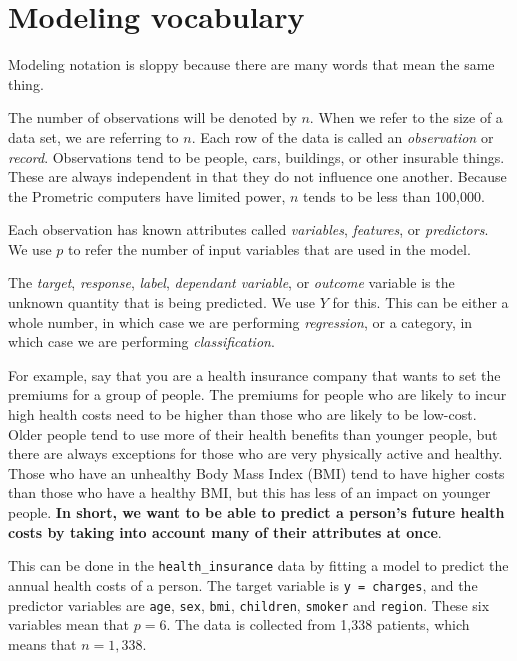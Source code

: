 \documentclass[
  openany]{book}
\begin{document}
\hypertarget{modeling-vocabulary}{%
\section{Modeling vocabulary}\label{modeling-vocabulary}}

Modeling notation is sloppy because there are many words that mean the same thing.

The number of observations will be denoted by \(n\). When we refer to the size of a data set, we are referring to \(n\). Each row of the data is called an \emph{observation} or \emph{record}. Observations tend to be people, cars, buildings, or other insurable things. These are always independent in that they do not influence one another. Because the Prometric computers have limited power, \(n\) tends to be less than 100,000.

Each observation has known attributes called \emph{variables}, \emph{features}, or \emph{predictors}. We use \(p\) to refer the number of input variables that are used in the model.

The \emph{target}, \emph{response}, \emph{label}, \emph{dependant variable}, or \emph{outcome} variable is the unknown quantity that is being predicted. We use \(Y\) for this. This can be either a whole number, in which case we are performing \emph{regression}, or a category, in which case we are performing \emph{classification}.

For example, say that you are a health insurance company that wants to set the premiums for a group of people. The premiums for people who are likely to incur high health costs need to be higher than those who are likely to be low-cost. Older people tend to use more of their health benefits than younger people, but there are always exceptions for those who are very physically active and healthy. Those who have an unhealthy Body Mass Index (BMI) tend to have higher costs than those who have a healthy BMI, but this has less of an impact on younger people. \textbf{In short, we want to be able to predict a person's future health costs by taking into account many of their attributes at once}.

This can be done in the \texttt{health\_insurance} data by fitting a model to predict the annual health costs of a person. The target variable is \texttt{y\ =\ charges}, and the predictor variables are \texttt{age}, \texttt{sex}, \texttt{bmi}, \texttt{children}, \texttt{smoker} and \texttt{region}. These six variables mean that \(p = 6\). The data is collected from 1,338 patients, which means that \(n = 1,338\).
\end{document}
